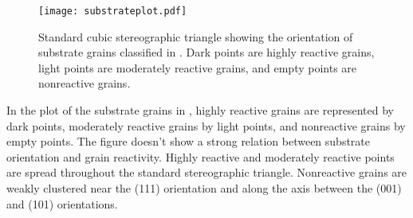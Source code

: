 \begin{figure}
	\begin{center}
	\texttt{[image: substrateplot.pdf]}
	\caption[Orientation of substrate grains]{%
	Standard cubic stereographic triangle showing the orientation of
	substrate grains classified in . Dark points are
	highly reactive grains, light points are moderately reactive grains,
	and empty points are nonreactive grains.}
	\label{fig:substrateplot}
	\end{center}
\end{figure}
In the plot of the substrate grains in , highly reactive grains are represented by dark points, moderately reactive grains by light points, and nonreactive grains by empty points. The figure doesn't show a strong relation between substrate orientation and grain reactivity. Highly reactive and moderately reactive points are spread throughout the standard stereographic triangle. Nonreactive grains are weakly clustered near the (111) orientation and along the axis between the (001) and (101) orientations.

